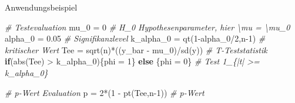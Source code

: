 \documentclass[
  8pt,
  ignorenonframetext,
]{beamer}
\newenvironment{Shaded}{\begin{snugshade}}{\end{snugshade}}
\newcommand{\CommentTok}[1]{\textcolor[rgb]{0.56,0.35,0.01}{\textit{#1}}}
\newcommand{\ControlFlowTok}[1]{\textcolor[rgb]{0.13,0.29,0.53}{\textbf{#1}}}
\newcommand{\DecValTok}[1]{\textcolor[rgb]{0.00,0.00,0.81}{#1}}
\newcommand{\FloatTok}[1]{\textcolor[rgb]{0.00,0.00,0.81}{#1}}
\newcommand{\FunctionTok}[1]{\textcolor[rgb]{0.00,0.00,0.00}{#1}}
\newcommand{\NormalTok}[1]{#1}
\newcommand{\OtherTok}[1]{\textcolor[rgb]{0.56,0.35,0.01}{#1}}
\newcommand{\SpecialCharTok}[1]{\textcolor[rgb]{0.00,0.00,0.00}{#1}}
\begin{document}
\begin{frame}[fragile]{Anwendungsbeispiel}
\begin{Shaded}
\begin{Highlighting}[]
\CommentTok{\# Testevaluation}
\NormalTok{mu\_0      }\OtherTok{=} \DecValTok{0}                                             \CommentTok{\# H\_0 Hypothesenparameter, hier \textbackslash{}mu = \textbackslash{}mu\_0}
\NormalTok{alpha\_0   }\OtherTok{=} \FloatTok{0.05}                                          \CommentTok{\# Signifikanzlevel}
\NormalTok{k\_alpha\_0 }\OtherTok{=} \FunctionTok{qt}\NormalTok{(}\DecValTok{1}\SpecialCharTok{{-}}\NormalTok{alpha\_0}\SpecialCharTok{/}\DecValTok{2}\NormalTok{,n}\DecValTok{{-}1}\NormalTok{)                           }\CommentTok{\# kritischer Wert}
\NormalTok{Tee       }\OtherTok{=} \FunctionTok{sqrt}\NormalTok{(n)}\SpecialCharTok{*}\NormalTok{((y\_bar }\SpecialCharTok{{-}}\NormalTok{ mu\_0)}\SpecialCharTok{/}\FunctionTok{sd}\NormalTok{(y))                }\CommentTok{\# T{-}Teststatistik}
\ControlFlowTok{if}\NormalTok{(}\FunctionTok{abs}\NormalTok{(Tee) }\SpecialCharTok{\textgreater{}}\NormalTok{ k\_alpha\_0)\{phi }\OtherTok{=} \DecValTok{1}\NormalTok{\} }\ControlFlowTok{else}\NormalTok{ \{phi }\OtherTok{=} \DecValTok{0}\NormalTok{\}          }\CommentTok{\# Test 1\_\{|t| \textgreater{}= k\_alpha\_0\}                             }

\CommentTok{\# p{-}Wert Evaluation}
\NormalTok{p         }\OtherTok{=} \DecValTok{2}\SpecialCharTok{*}\NormalTok{(}\DecValTok{1} \SpecialCharTok{{-}} \FunctionTok{pt}\NormalTok{(Tee,n}\DecValTok{{-}1}\NormalTok{))                           }\CommentTok{\# p{-}Wert}
\end{Highlighting}
\end{Shaded}
\end{frame}
\end{document}
